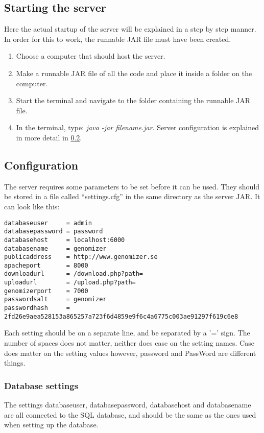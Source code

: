 \subsection{Starting the server}
Here the actual startup of the server will be explained in a step by step manner.
In order for this to work, the runnable JAR file must have been created.
\begin{enumerate}
\item Choose a computer that should host the server.
\item Make a runnable JAR file of all the code and place it inside a folder on the computer.
\item Start the terminal and navigate to the folder containing the runnable JAR file.
\item In the terminal, type: \emph{java -jar filename.jar}. Server configuration is explained in more detail in \ref{sec:com_ArgExpl}.\\ 
\end{enumerate}

\subsection{Configuration}
\label{sec:com_ArgExpl}
The server requires some parameters to be set before it can be used. They should be stored in a file called
``settings.cfg'' in the same directory as the server JAR. It can look like this:
\begin{verbatim}
databaseuser     = admin
databasepassword = password
databasehost     = localhost:6000
databasename     = genomizer
publicaddress    = http://www.genomizer.se
apacheport       = 8000
downloadurl      = /download.php?path=
uploadurl        = /upload.php?path=
genomizerport    = 7000
passwordsalt     = genomizer
passwordhash     = 2fd26e9aea528153a865257a723f6d4859e9f6c4a6775c003ae91297f619c6e8
\end{verbatim}
Each setting should be on a separate line, and be separated by a '=' sign. The number of spaces does not matter,
neither does case on the setting names. Case does matter on the setting values however, password and PassWord are
different things.

\subsubsection{Database settings}
The settings databaseuser, databasepassword, databasehost and databasename are all connected to the SQL database,
and should be the same as the ones used when setting up the database. 
